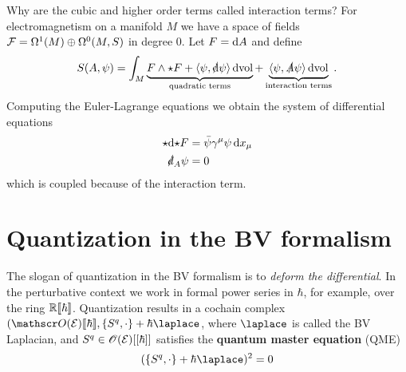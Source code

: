 \begin{example}
  Why are the cubic and higher order terms called interaction terms?
For electromagnetism on a manifold $M$ we have a space of fields
  $\mathcal{F} = \Omega^1(M) \oplus \Omega^0(M, S)$ in degree $0$. Let $F = \mathrm{d} A$ and define
  \begin{equation*}
    S(A, \psi) = \int_M
    \underbrace{F \wedge {\star} F
    + \langle \psi, \slashed{\mathrm{d}} \psi \rangle \, \mathrm{d} \mathrm{vol}}_{\text{quadratic terms}}
    + \underbrace{\langle \psi, \slashed{A} \psi \rangle \, \mathrm{d} \mathrm{vol}}_{\text{interaction terms}}.
  \end{equation*}
  Computing the Euler-Lagrange equations we obtain the system of differential equations
  \begin{align*}
    {\star} \mathrm{d} {\star} F &= \bar{\psi} \gamma^\mu \psi \, \mathrm{d} x_\mu \\
    \slashed{d}_A \psi &= 0
  \end{align*}
  which is coupled because of the interaction term.
\end{example}

\section{Quantization in the BV formalism}

The slogan of quantization in the BV formalism is to \textit{deform the differential}.
In the perturbative context we work in formal power series in $\hbar$, for example, over the ring $\mathbb{R} [\![ {\hbar} ]\!]$.
Quantization results in a cochain complex
$(\Oscr(\Ecal)\formalpow{\hbar}, \{S^q, \cdot\} + \hbar \laplace$, where $\laplace$ is called the BV Laplacian, and 
$S^q \in \mathscr{O}(\mathcal{E})[[\hbar]]$ satisfies the \textbf{quantum master equation} (QME)
\begin{equation*}
  (\{S^q, \cdot \} + \hbar \laplace)^2 = 0
\end{equation*}

